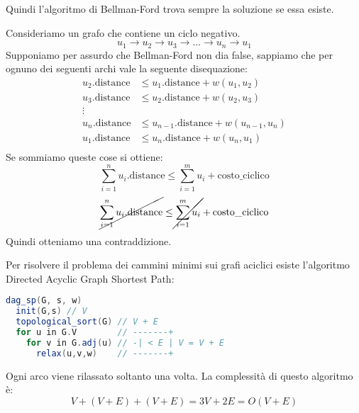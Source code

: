 \documentclass[a4paper]{article}
\begin{document}
Quindi l'algoritmo di Bellman-Ford trova sempre la soluzione se essa esiste.

\vspace{1em}
\noindent
Consideriamo un grafo che contiene un ciclo negativo.
\[
  u_1 \to u_2 \to u_3 \to \ldots \to u_n \to u_1
\] 
Supponiamo per assurdo che
Bellman-Ford non dia false, sappiamo che per ognuno dei seguenti archi vale la
seguente disequazione:
\[
\begin{aligned}
  u_2.\text{distance} & \le u_1.\text{distance} + w(u_1,u_2) \\
  u_3.\text{distance} & \le u_2.\text{distance} + w(u_2,u_3) \\
  \vdots\\
  u_n.\text{distance} & \le u_{n-1}.\text{distance} + w(u_{n-1},u_n) \\
  u_1.\text{distance} & \le u_{n}.\text{distance} + w(u_{n},u_1) \\
\end{aligned}
\] 
Se sommiamo queste cose si ottiene:
\[
  \sum_{i=1}^n u_i.\text{distance} \le \sum_{i=1}^m u_i + \text{costo\_ciclico}
\] 
\[
  \cancel{\sum_{i=1}^n u_i.\text{distance}} \le \cancel{\sum_{i=1}^m u_i} + \text{costo\_ciclico}
\] 
Quindi otteniamo una contraddizione.

\vspace{1em}
\noindent
Per risolvere il problema dei cammini minimi sui grafi aciclici esiste l'algoritmo
Directed Acyclic Graph Shortest Path:
\begin{lstlisting}[language=Scala]
dag_sp(G, s, w)
  init(G,s) // V
  topological_sort(G) // V + E
  for u in G.V        // -------+ 
    for v in G.adj(u) // -| < E | V = V + E
      relax(u,v,w)    // -------+
\end{lstlisting}
Ogni arco viene rilassato soltanto una volta. La complessità di questo algoritmo è:
\[
  V + (V + E) + (V + E) = 3V + 2E = O(V + E)
\] 
\end{document}
